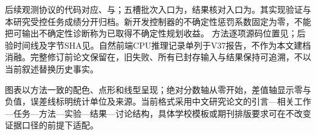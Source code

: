 \documentclass[11pt,a4paper]{article}
\begin{document}
后续观测协议的代码对应、与；五槽批次入口为，结果核对入口为。其实现验证与本研究受控任务成绩分开归档。新开发控制器的不确定性惩罚系数固定为零，不能把可输出不确定性诊断称为已取得不确定性规划收益。
方法逐项源码位置见；后验时间线及字节SHA见。自然前端CPU推理记录单列于V37报告，不作为本文建档消融。完整修订前论文保留在，旧失败、所有已封存输入与结果保持可追溯，不以当前叙述替换历史事实。

\par\endgroup

图表以方法一致的配色、点形和线型呈现；绝对分数轴从零开始，差值轴显示零与负值，误差线标明统计单位及来源。当前格式采用中文研究论文的引言—相关工作—任务—方法—实验—结果—讨论结构，具体学校模板或期刊排版要求可在不改变证据口径的前提下适配。
\end{document}
